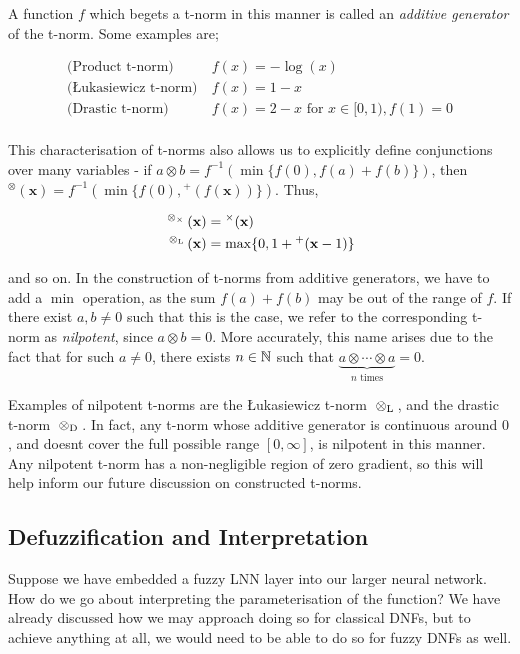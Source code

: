 \documentclass[conference]{report}
\begin{document}
A function $f$ which begets a t-norm in this manner is called an \textit{additive generator} of the t-norm. Some examples are;

$$
\begin{aligned}
\text{(Product t-norm)} &\ f(x) = -\log(x) \\
\text{(Łukasiewicz t-norm)} &\ f(x) = 1 - x \\
\text{(Drastic t-norm)} &\ f(x) = 2 - x \text{ for } x \in [0,1), f(1) = 0\\
\end{aligned}
$$

This characterisation of t-norms also allows us to explicitly define conjunctions over many variables - if $a \otimes b = f^{-1}(\min\{f(0), f(a) + f(b)\})$, then ${^\otimes}(\mathbf{x}) = f^{-1}(\min\{f(0),{^+}(f(\mathbf{x}))\})$. Thus,

$$
\begin{aligned}
^{\mspace{4mu}\otimes_\times\mspace{4mu}}(\mathbf{x}) &= {^\times}(\mathbf{x}) \\
^{\mspace{4mu}\otimes_\text{L}\mspace{4mu}}(\mathbf{x}) &= \max\{0, 1 + {^+}(\mathbf{x} - 1)\}
\end{aligned}
$$


and so on. In the construction of t-norms from additive generators, we have to add a $\min$ operation, as the sum $f(a) + f(b)$ may be out of the range of $f$. If there exist $a,b \neq 0$ such that this is the case, we refer to the corresponding t-norm as \textit{nilpotent}, since $a \otimes b = 0$. More accurately, this name arises due to the fact that for such $a \neq 0$, there exists $n \in \mathbb{N}$ such that $\underbrace{a \otimes \cdots \otimes a}_{n \text{ times}} = 0$. 

Examples of nilpotent t-norms are the Łukasiewicz t-norm ${\mspace{4mu}\otimes_\text{L}\mspace{4mu}}$, and the drastic t-norm ${\mspace{4mu}\otimes_\text{D}\mspace{4mu}}$. In fact, any t-norm whose additive generator is continuous around $0$, and doesnt cover the full possible range $[0, \infty]$, is nilpotent in this manner. Any nilpotent t-norm has a non-negligible region of zero gradient, so this will help inform our future discussion on constructed t-norms.

\subsection{Defuzzification and Interpretation}

Suppose we have embedded a fuzzy LNN layer into our larger neural network. How do we go about interpreting the parameterisation of the function? We have already discussed how we may approach doing so for classical DNFs, but to achieve anything at all, we would need to be able to do so for fuzzy DNFs as well.
\end{document}
